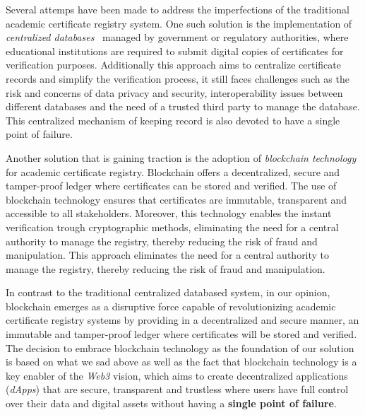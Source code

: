 Several attemps have been made to address the imperfections of the traditional academic certificate registry system.
One such solution is the implementation of \textit{centralized databases}~\cite{OLSON200971} managed by government or regulatory authorities, where educational institutions are required to
submit digital copies of certificates for verification purposes. Additionally this approach aims to centralize certificate records and simplify the verification process, it still faces challenges
such as the risk and concerns of data privacy and security, interoperability issues between different databases and the need of a trusted third party to manage the database.
This centralized mechanism of keeping record is also devoted to have a single point of failure.

Another solution that is gaining traction is the adoption of \textit{blockchain technology} for academic certificate registry. Blockchain offers a decentralized, secure and tamper-proof ledger where certificates can be stored and verified.
The use of blockchain technology ensures that certificates are immutable, transparent and accessible to all stakeholders. Moreover, this technology enables the instant verification trough cryptographic methods,
eliminating the need for a central authority to manage the registry, thereby reducing the risk of fraud and manipulation.
This approach eliminates the need for a central authority to manage the registry, thereby reducing the risk of fraud and manipulation.

In contrast to the traditional centralized databased system, in our opinion, blockchain emerges as a disruptive force capable of revolutionizing academic certificate registry systems
by providing in a decentralized and secure manner, an immutable and tamper-proof ledger where certificates will be stored and verified.
The decision to embrace blockchain technology as the foundation of our solution is based on what we sad above as well as the fact that blockchain technology is a key enabler of the \textit{Web3} vision,
which aims to create decentralized applications (\textit{dApps}) that are secure, transparent and trustless where users have full control over their data and digital assets without having a \textbf{single point of failure}.

\pagebreak %


